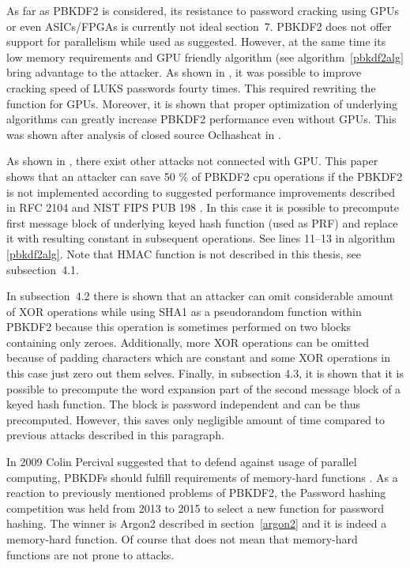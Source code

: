 \documentclass[nolof]{fithesis3}
\begin{document}
As far as PBKDF2 is considered, its resistance to password cracking using GPUs or even ASICs/FPGAs is currently not ideal \parencite{mosnacek}{section~7}. PBKDF2 does not offer support for parallelism while used as suggested. However, at the same time its low memory requirements and GPU friendly algorithm (see algorithm~\ref{pbkdf2alg} bring advantage to the attacker. As shown in \parencite{mosnacek}, it was possible to improve cracking speed of LUKS passwords fourty times. This required rewriting the function for GPUs. Moreover, it is shown that proper optimization of underlying algorithms can greatly increase PBKDF2 performance even without GPUs. This was shown after analysis of closed source Oclhashcat in \parencite{pbkdf2accel}.

As shown in \parencite{pbkdf2weakness}, there exist other attacks not connected with GPU. This paper shows that an attacker can save 50 \% of PBKDF2 cpu operations if the PBKDF2 is not implemented according to suggested performance improvements described in RFC 2104 \parencite{rfc2104} and NIST FIPS PUB 198 \parencite{fipspub198}. In this case it is possible to precompute first message block of underlying keyed hash function (used as PRF) and replace it with resulting constant in subsequent operations. See lines 11--13 in algorithm \ref{pbkdf2alg}. Note that HMAC function is not described in this thesis, see \parencite{pbkdf2weakness}{subsection~4.1}. 

In \parencite{pbkdf2weakness}{subsection~4.2} there is shown that an attacker can omit considerable amount of XOR operations while using SHA1 as a pseudorandom function within PBKDF2 because this operation is sometimes performed on two blocks containing only zeroes. Additionally, more XOR operations can be omitted because of padding characters which are constant and some XOR operations in this case just zero out them selves. Finally, in subsection 4.3, it is shown that it is possible to precompute the word expansion part of the second message block of a keyed hash function. The block is password independent and can be thus precomputed. However, this saves only negligible amount of time compared to previous attacks described in this paragraph.

In 2009 Colin Percival suggested that to defend against usage of parallel computing, PBKDFs should fulfill requirements of memory-hard functions \parencite{memoryhard}.   As a reaction to previously mentioned problems of PBKDF2, the Password hashing competition was held from 2013 to 2015 to select a new function for password hashing. The winner is Argon2 described in section~\ref{argon2} and it is indeed a memory-hard function. Of course that does not mean that memory-hard functions are not prone to attacks.
\end{document}
